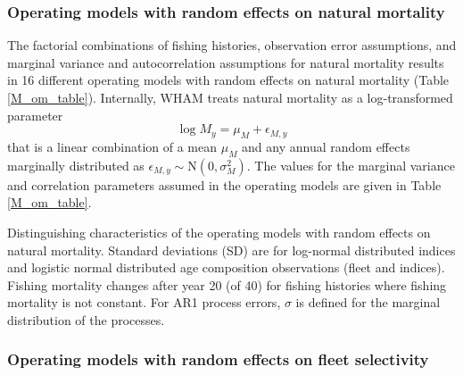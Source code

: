 \documentclass[
  12pt,
]{article}
\begin{document}
\hypertarget{operating-models-with-random-effects-on-natural-mortality}{%
\subsubsection*{Operating models with random effects on natural
mortality}\label{operating-models-with-random-effects-on-natural-mortality}}

The factorial combinations of fishing histories, observation error
assumptions, and marginal variance and autocorrelation assumptions for
natural mortality results in 16 different operating models with random
effects on natural mortality (Table \ref{M_om_table}). Internally, WHAM
treats natural mortality as a log-transformed parameter \[
\log M_y = \mu_M + \epsilon_{M,y}
\] that is a linear combination of a mean \(\mu_M\) and any annual
random effects marginally distributed as
\(\epsilon_{M,y} \sim \text{N}\left(0,\sigma_M^2\right)\). The values
for the marginal variance and correlation parameters assumed in the
operating models are given in Table \ref{M_om_table}.

\begin{landscape}
\begin{table}
\caption{Distinguishing characteristics of the operating models with random effects on natural mortality. Standard deviations (SD) are for log-normal distributed indices and logistic normal distributed age composition observations (fleet and indices). Fishing mortality changes after year 20 (of 40) for fishing histories where fishing mortality is not constant. For AR1 process errors, $\sigma$ is defined for the marginal distribution of the processes.}\label{M_om_table}
{}
\end{table}
\end{landscape}

\hypertarget{operating-models-with-random-effects-on-fleet-selectivity}{%
\subsubsection*{Operating models with random effects on fleet
selectivity}\label{operating-models-with-random-effects-on-fleet-selectivity}}
\end{document}
